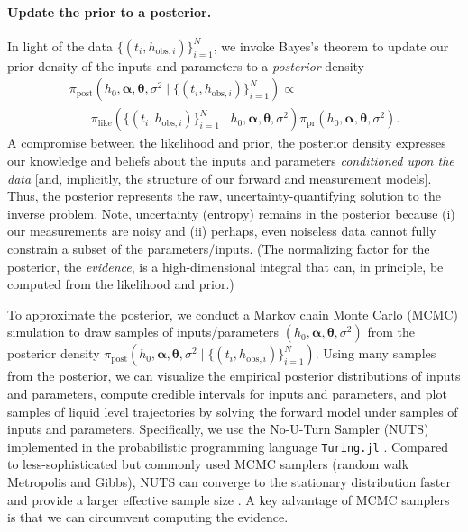 \documentclass[a4paper,fleqn]{cas-dc}
\newcommand\thedata {$\{(t_i,h_{\text{obs}, i})\}_{i=1}^{N}$\xspace}
\newcommand\thedatanomath {\{(t_i,h_{\text{obs}, i})\}_{i=1}^{N}}
\begin{document}
\paragraph{Update the prior to a posterior.}
In light of the data \thedata, we invoke Bayes's theorem  \cite{van2021bayesian,calvetti2018inverse} to update our prior density of the inputs and parameters to a \emph{posterior} density
\begin{multline}
	\pi_{\text{post}}(h_0, \boldsymbol \alpha, \boldsymbol \theta, \sigma^2 \mid \thedatanomath) \propto \\ %
	\phantom{xxx} \pi_{\text{like}}(\thedatanomath \mid h_0,  \boldsymbol \alpha, \boldsymbol \theta, \sigma^2 ) 
	\pi_{\text{pr}}(h_0, \boldsymbol\alpha, \boldsymbol \theta, \sigma^2).
	 \label{eq:post}
\end{multline} 
A compromise between the likelihood and prior,
the posterior density expresses our knowledge and beliefs about the inputs and parameters \emph{conditioned upon the data} [and, implicitly, the structure of our forward and measurement models]. 
Thus, the posterior represents the raw, uncertainty-quantifying solution to the inverse problem.
Note, uncertainty (entropy) remains in the posterior because
 (i) our measurements are noisy and 
 (ii) perhaps, even noiseless data cannot fully constrain a subset of the parameters/inputs.
(The normalizing factor for the posterior, the \emph{evidence}, is a high-dimensional integral that can, in principle, be computed from the likelihood and prior.)



To approximate the posterior, we conduct a Markov chain Monte Carlo (MCMC) simulation \cite{robert1999monte,van2021bayesian} to draw samples of inputs/parameters $(h_0, \boldsymbol \alpha, \boldsymbol \theta, \sigma^2 )$ from the posterior density $\pi_{\text{post}}(h_0, \boldsymbol \alpha, \boldsymbol \theta, \sigma^2 \mid \thedatanomath)$. 
Using many samples from the posterior, we can visualize the empirical posterior distributions of inputs and parameters, compute credible intervals for inputs and parameters, and plot samples of liquid level trajectories by solving the forward model under samples of inputs and parameters.
Specifically, we use the No-U-Turn Sampler (NUTS) \cite{hoffman2014no} implemented in the probabilistic programming language \cite{gordon2014probabilistic} \texttt{Turing.jl} \cite{ge2018turing}. Compared to less-sophisticated but commonly used MCMC samplers (random walk Metropolis and Gibbs), NUTS can converge to the stationary distribution faster and provide a larger effective sample size \cite{chong2017comparison,hoffman2014no}.
A key advantage of MCMC samplers is that we can circumvent computing the evidence. 
\end{document}
